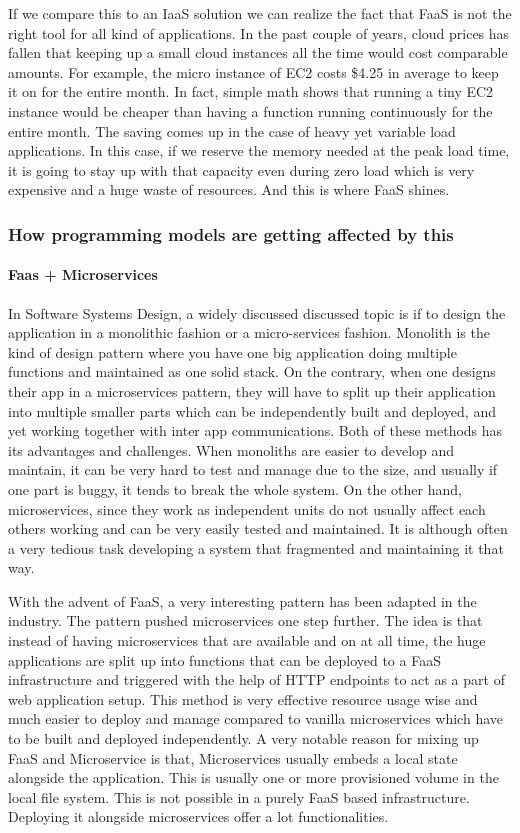 \documentclass[12pt,titlepage]{article}
\begin{document}
If we compare this to an IaaS solution we can realize the fact that FaaS is not
the right tool for all kind of applications. In the past couple of years, cloud
prices has fallen that keeping up a small cloud instances all the time would
cost comparable amounts. For example, the micro instance of EC2 costs \$4.25 in
average to keep it on for the entire month. In fact, simple math shows that
running a tiny EC2 instance would be cheaper than having a function running
continuously for the entire month. The saving comes up in the case of heavy yet
variable load applications. In this case, if we reserve the memory needed at the
peak load time, it is going to stay up with that capacity even during zero load
which is very expensive and a huge waste of resources. And this is where FaaS shines.


\subsubsection{How programming models are getting affected by this}
\label{sec:orga96a123}
\paragraph{Faas + Microservices}
\label{sec:org0f599b1}
In Software Systems Design, a widely discussed discussed topic is if to design the
application in a monolithic fashion or a micro-services fashion. Monolith is the
kind of design pattern where you have one big application doing multiple
functions and maintained as one solid stack. On the contrary, when one designs
their app in a microservices pattern, they will have to split up their application
into multiple smaller parts which can be independently built and deployed, and
yet working together with inter app communications. Both of these methods has
its advantages and challenges. When monoliths are easier to develop and
maintain, it can be very hard to test and manage due to the size, and usually if
one part is buggy, it tends to break the whole system. On the other hand,
microservices, since they work as independent units do not usually affect each
others working and can be very easily tested and maintained. It is although
often a very tedious task developing a system that fragmented and maintaining it
that way.  

With the advent of FaaS, a very interesting pattern has been adapted in the
industry. The pattern pushed microservices one step further. The idea is that
instead of having microservices that are available and on at all time, the huge
applications are split up into functions that can be deployed to a FaaS
infrastructure and triggered with the help of HTTP endpoints to act as a part of
web application setup. This method is very effective resource usage wise and
much easier to deploy and manage compared to vanilla microservices which have to
be built and deployed independently. A very notable reason for mixing up FaaS and
Microservice is that, Microservices usually embeds a local state alongside the application.
This is usually one or more provisioned volume in the local file system. This is
not possible in a purely FaaS based infrastructure. Deploying it alongside
microservices offer a lot functionalities.
\end{document}

